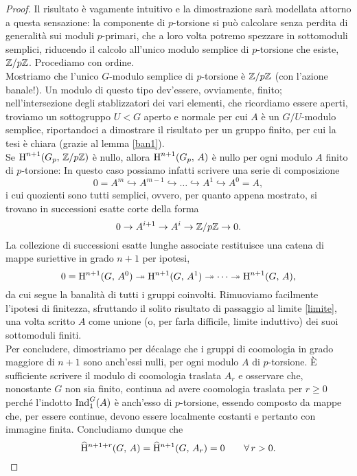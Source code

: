 \begin{proof}
	Il risultato è vagamente intuitivo e la dimostrazione sarà modellata attorno a questa sensazione: la componente di $ p $-torsione si può calcolare senza perdita di generalità sui moduli $ p $-primari, che a loro volta potremo spezzare in sottomoduli semplici, riducendo il calcolo all'unico modulo semplice di $ p $-torsione che esiste, $ \mathbb{Z}/p\mathbb{Z} $. Procediamo con ordine. \\
	
	Mostriamo che l'unico $ G $-modulo semplice di $ p $-torsione è $ \mathbb{Z}/p\mathbb{Z} $ (con l'azione banale!). Un modulo di questo tipo dev'essere, ovviamente, finito; nell'intersezione degli stablizzatori dei vari elementi, che ricordiamo essere aperti, troviamo un sottogruppo $ U < G $ aperto e normale per cui $ A $ è un $ G/U $-modulo semplice, riportandoci a dimostrare il risultato per un gruppo finito, per cui la tesi è chiara (grazie al lemma \ref{ban1}). \\
	
	Se $ \operatorname{H}^{n+1}(G_p, \, \mathbb{Z}/p\mathbb{Z}) $ è nullo, allora $ \operatorname{H}^{n+1}(G_p, \, A) $ è nullo per ogni modulo $ A $ finito di $ p $-torsione: In questo caso possiamo infatti scrivere una serie di composizione
	\[ 0 = A^m \hookrightarrow A^{m-1} \hookrightarrow \dots \hookrightarrow A^1 \hookrightarrow A^0 = A, \]
	i cui quozienti sono tutti semplici, ovvero, per quanto appena mostrato, si trovano in successioni esatte corte della forma
	\[ 0 \to A^{i+1} \to A^i \to \mathbb{Z}/p\mathbb{Z} \to 0. \]
	La collezione di successioni esatte lunghe associate restituisce una catena di mappe suriettive in grado $ n+1 $ per ipotesi,
	\[ 0 = \operatorname{H}^{n+1}(G, \, A^0) \twoheadrightarrow \operatorname{H}^{n+1}(G, \, A^1) \twoheadrightarrow \dots \twoheadrightarrow \operatorname{H}^{n+1}(G, \, A), \]
	da cui segue la banalità di tutti i gruppi coinvolti. Rimuoviamo facilmente l'ipotesi di finitezza, sfruttando il solito risultato di passaggio al limite \ref{limite}, una volta scritto $ A $ come unione (o, per farla difficile, limite induttivo) dei suoi sottomoduli finiti. \\
	
	Per concludere, dimostriamo per décalage che i gruppi di coomologia in grado maggiore di $ n+1 $ sono anch'essi nulli, per ogni modulo $ A $ di $ p $-torsione. È sufficiente scrivere il modulo di coomologia traslata $ A_{r} $ e osservare che, nonostante $ G $ non sia finito, continua ad avere coomologia traslata per $ r \geq 0 $ perché l'indotto $ \operatorname{Ind}_1^G(A) $ è anch'esso di $ p $-torsione, essendo composto da mappe che, per essere continue, devono essere localmente costanti e pertanto con immagine finita. Concludiamo dunque che	
	\begin{equation*}
	 \operatorname{\widehat{H}^{\mathnormal{n}+1+\mathnormal{r}}}(G, \, A) = \operatorname{\widehat{H}^{\mathnormal{n}+1}}(G, \, A_r) = 0 \qquad \forall\, r > 0. \qedhere
	\end{equation*}
\end{proof}

